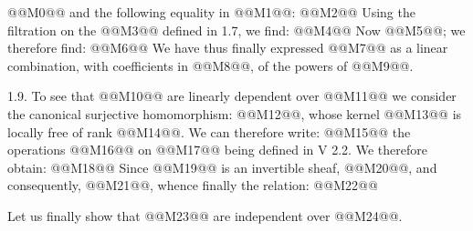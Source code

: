 @@M0@@
and the following equality in @@M1@@:
@@M2@@
Using the filtration on the @@M3@@ defined in 1.7, we find:
@@M4@@
Now @@M5@@; we therefore find:
@@M6@@
We have thus finally expressed @@M7@@ as a linear combination, with coefficients in @@M8@@, of the powers of @@M9@@.

1.9. To see that @@M10@@ are linearly dependent over @@M11@@ we consider the canonical surjective homomorphism: @@M12@@, whose kernel @@M13@@ is locally free of rank @@M14@@. We can therefore write:
@@M15@@
the operations @@M16@@ on @@M17@@ being defined in V 2.2. We therefore obtain:
@@M18@@
Since @@M19@@ is an invertible sheaf, @@M20@@, and consequently, @@M21@@, whence finally the relation:
@@M22@@

Let us finally show that @@M23@@ are independent over @@M24@@.

